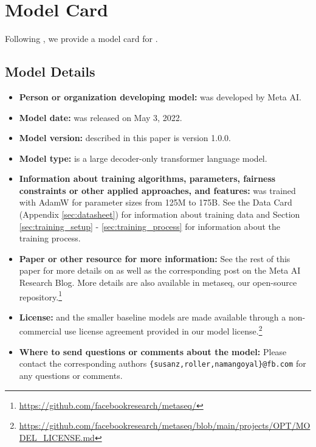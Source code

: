 \section{Model Card}
\label{sec:model_card}
Following \citet{DBLP:journals/corr/abs-1810-03993}, we provide a model card for \OPT{}. 

\subsection{Model Details}
\begin{itemize}
    \item \textbf{Person or organization developing model:} \OPT{} was developed by Meta AI.
    \item \textbf{Model date:} \OPT{} was released on May 3, 2022.
    \item \textbf{Model version:} \OPT{} described in this paper is version 1.0.0.
    \item \textbf{Model type:} \OPT{} is a large decoder-only transformer language model.
    \item \textbf{Information about training algorithms, parameters, fairness constraints or other applied approaches, and features:} \OPT{} was trained with AdamW for parameter sizes from 125M to 175B. See the Data Card (Appendix \ref{sec:datasheet}) for information about training data and Section \ref{sec:training_setup} - \ref{sec:training_process} for information about the training process. 
    \item \textbf{Paper or other resource for more information:} See the rest of this paper for more details on \OPT{} as well as the corresponding post on the Meta AI Research Blog. More details are also available in metaseq, our open-source repository.\footnote{\url{https://github.com/facebookresearch/metaseq/}}
    \item \textbf{License:} \OPT{} and the smaller baseline models are made available through a non-commercial use license agreement provided in our model license.\footnote{\url{https://github.com/facebookresearch/metaseq/blob/main/projects/OPT/MODEL_LICENSE.md}}
    \item \textbf{Where to send questions or comments about the model:} Please contact the corresponding authors \texttt{\{susanz,roller,namangoyal\}@fb.com} for any questions or comments.
\end{itemize}


